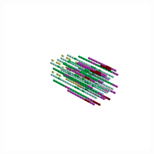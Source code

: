 \begin{minipage}[b]{0.50\linewidth}
\begin{figure}[H]
        \vspace*{-8cm}
        \hspace*{2cm}
        \includegraphics[width=8cm]{src/symmetries/pattern10_4-45.png}
        \vspace*{-2.5cm}
  \caption*{}
  \end{figure}
\end{minipage}
\hspace{1cm}
